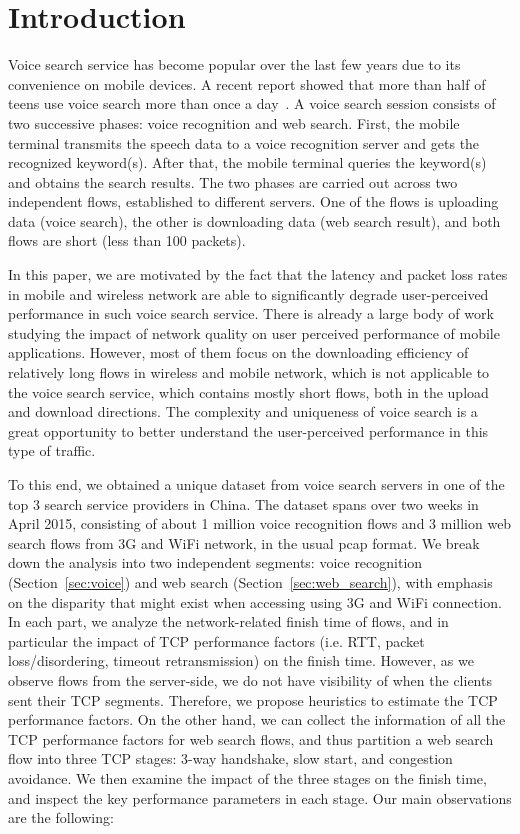 
\section{Introduction}
\label{sec:intro}

Voice search service has become popular over the last few years due to its convenience on mobile devices. A recent report showed that more than half of teens use voice search more than once a day~\cite{voice_search_report}. A voice search session consists of two successive phases: voice recognition and web search. First, the mobile terminal transmits the speech data to a voice recognition server and gets the recognized keyword(s). After that, the mobile terminal queries the keyword(s) and obtains the search results. The two phases are carried out across two independent flows, established to different servers. One of the flows is uploading data (voice search), the other is downloading data (web search result), and both flows are short (less than 100 packets).

In this paper, we are motivated by the fact that the latency and packet loss rates in mobile and wireless network are able to significantly degrade user-perceived performance in such voice search service. There is already a large body of work \cite{sommers2012cell,yu2014can,chen2012network,sharma2010goodput} studying the impact of network quality on user perceived performance of mobile applications. However, most of them focus on the downloading efficiency of relatively long flows in wireless and mobile network, which is not applicable to the voice search service, which contains mostly short flows, both in the upload and download directions. The complexity and uniqueness of voice search is a great opportunity to better understand the user-perceived performance in this type of traffic.

To this end, we obtained a unique dataset from voice search servers in one of the top 3 search service providers in China. The dataset spans over two weeks in April 2015, consisting of about 1 million voice recognition flows and 3 million web search flows from 3G and WiFi network, in the usual pcap format. We break down the analysis into two independent segments: voice recognition (Section~\ref{sec:voice}) and web search (Section~\ref{sec:web_search}), with emphasis on the disparity that might exist when accessing using 3G and WiFi connection. In each part, we analyze the network-related finish time of flows, and in particular the impact of TCP performance factors (i.e. RTT, packet loss/disordering, timeout retransmission) on the finish time. However, as we observe flows from the server-side, we do not have visibility of when the clients sent their TCP segments. Therefore, we propose heuristics to estimate the TCP performance factors. On the other hand, we can collect the information of all the TCP performance factors for web search flows, and thus partition a web search flow into three TCP stages: 3-way handshake, slow start, and congestion avoidance. We then examine the impact of the three stages on the finish time, and inspect the key performance parameters in each stage. Our main observations are the following:


